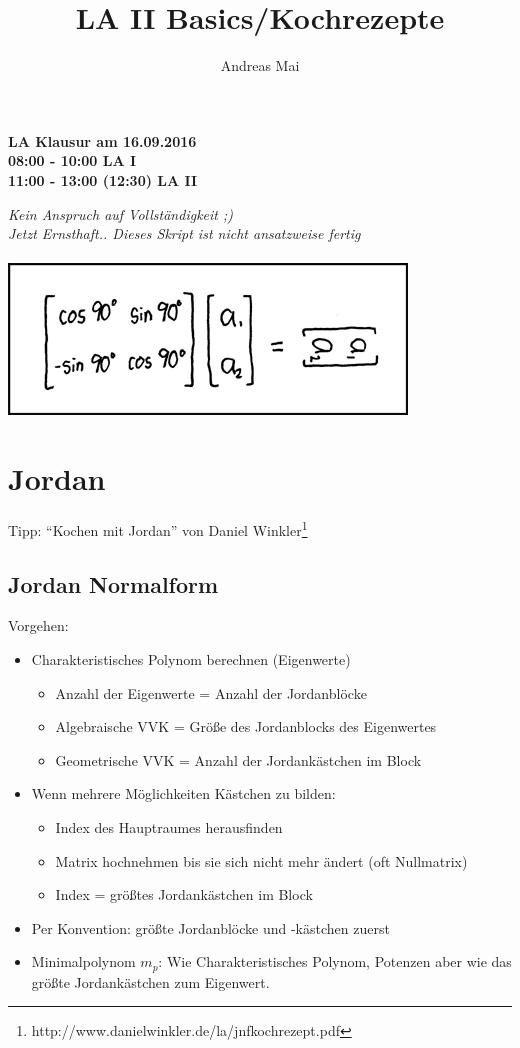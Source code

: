 \documentclass[a4paper,portrait]{scrartcl}
\author{Andreas Mai}
\title{LA II Basics/Kochrezepte}
\begin{document}
\maketitle
\begin{center}
\textbf{LA Klausur am 16.09.2016} \\
\textbf{08:00 - 10:00 LA I} \\
\textbf{11:00 - 13:00 (12:30) LA II} 
\end{center}

\begin{center}
\textit{Kein Anspruch auf Vollständigkeit ;)} \\
\textit{Jetzt Ernsthaft.. Dieses Skript ist nicht ansatzweise fertig} \\ \\
\includegraphics{matrix_transform.png}

\end{center}
\clearpage
\tableofcontents
\clearpage
\setcounter{page}{1}
\section{Jordan}
Tipp: \enquote{Kochen mit Jordan} von Daniel Winkler\footnote{http://www.danielwinkler.de/la/jnfkochrezept.pdf}
\subsection{Jordan Normalform}
Vorgehen:
\begin{itemize}
	\item Charakteristisches Polynom berechnen (Eigenwerte)
	\begin{itemize}
		\item Anzahl der Eigenwerte = Anzahl der Jordanblöcke
		\item Algebraische VVK = Größe des Jordanblocks des Eigenwertes
		\item Geometrische VVK = Anzahl der Jordankästchen im Block
	\end{itemize}
	\item Wenn mehrere Möglichkeiten Kästchen zu bilden:
	\begin{itemize}
		\item Index des Hauptraumes herausfinden
		\item Matrix hochnehmen bis sie sich nicht mehr ändert (oft Nullmatrix)
		\item Index = größtes Jordankästchen im Block
	\end{itemize}
	\item Per Konvention: größte Jordanblöcke und -kästchen zuerst
	\item Minimalpolynom $m_p$: Wie Charakteristisches Polynom, Potenzen aber wie das größte Jordankästchen zum Eigenwert.
\end{itemize}
\end{document}
